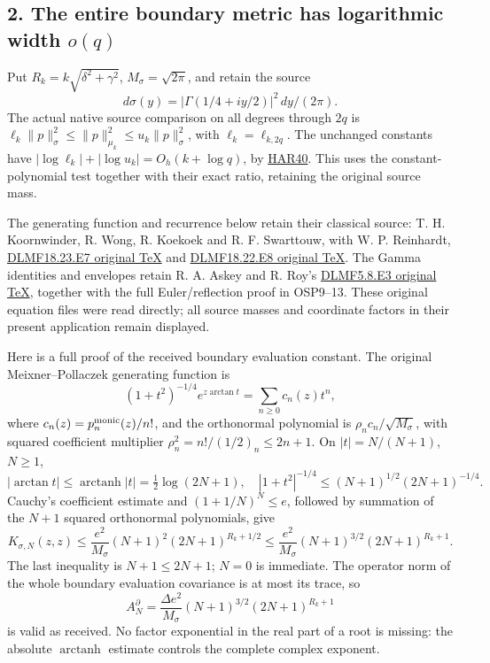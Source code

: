 \documentclass[11pt]{article}
\begin{document}
\subsection{\texorpdfstring{2. The entire boundary metric has logarithmic width \(o(q)\)}{2. The entire boundary metric has logarithmic width o(q)}}\label{the-entire-boundary-metric-has-logarithmic-width-oq}

Put \(R_k=k\sqrt{\delta^2+\gamma^2}\), \(M_\sigma=\sqrt{2\pi}\), and retain the source \[
d\sigma(y)=|\Gamma(1/4+iy/2)|^2\,dy/(2\pi).
\] The actual native source comparison on all degrees through \(2q\) is \(\ell_k\|p\|_\sigma^2\le\|p\|_{\mu_k}^2\le u_k\|p\|_\sigma^2\), with \(\ell_k=\ell_{k,2q}\). The unchanged constants have \(|\log \ell_k|+|\log u_k|=O_h(k+\log q)\), by \href{https://github.com/KokunoYumeto/zeta-function-research-reader/blob/360d3c1d798da434966d35f7e407fc59c14f234b/workbenches/splitzero-tandem/continuations/20260921-critical-inverse-activation/HARMONIC_PROOFS.md\#L440}{HAR40}. This uses the constant-polynomial test together with their exact ratio, retaining the original source mass.

The generating function and recurrence below retain their classical source: T. H. Koornwinder, R. Wong, R. Koekoek and R. F. Swarttouw, with W. P. Reinhardt, \href{https://dlmf.nist.gov/18.23.E7.tex}{DLMF18.23.E7 original TeX} and \href{https://dlmf.nist.gov/18.22.E8.tex}{DLMF18.22.E8 original TeX}. The Gamma identities and envelopes retain R. A. Askey and R. Roy's \href{https://dlmf.nist.gov/5.8.E3.tex}{DLMF5.8.E3 original TeX}, together with the full Euler/reflection proof in OSP9--13. These original equation files were read directly; all source masses and coordinate factors in their present application remain displayed.

Here is a full proof of the received boundary evaluation constant. The original Meixner--Pollaczek generating function is \[
(1+t^2)^{-1/4}e^{z\arctan t}=\sum_{n\ge0}c_n(z)t^n,
\] where \(c_n(z)=p_n^{\rm monic}(z)/n!\), and the orthonormal polynomial is \(\rho_nc_n/\sqrt{M_\sigma}\), with squared coefficient multiplier \(\rho_n^2=n!/(1/2)_n\le2n+1\). On \(|t|=N/(N+1)\), \(N\ge1\), \[
|\arctan t|\le\operatorname{arctanh}|t|=\tfrac12\log(2N+1),\quad
|1+t^2|^{-1/4}\le(N+1)^{1/2}(2N+1)^{-1/4}.
\] Cauchy's coefficient estimate and \((1+1/N)^N\le e\), followed by summation of the \(N+1\) squared orthonormal polynomials, give \[
K_{\sigma,N}(z,z)
\le\frac{e^2}{M_\sigma}(N+1)^2(2N+1)^{R_k+1/2}
\le\frac{e^2}{M_\sigma}(N+1)^{3/2}(2N+1)^{R_k+1}.
\] The last inequality is \(N+1\le2N+1\); \(N=0\) is immediate. The operator norm of the whole boundary evaluation covariance is at most its trace, so \[
A_N^\partial=\frac{\Delta e^2}{M_\sigma}
(N+1)^{3/2}(2N+1)^{R_k+1}
\tag{IC12}
\] is valid as received. No factor exponential in the real part of a root is missing: the absolute \(\operatorname{arctanh}\) estimate controls the complete complex exponent.
\end{document}
